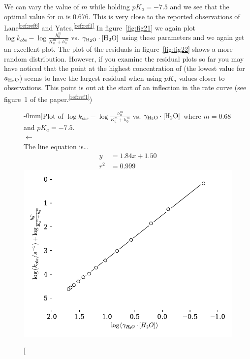 \documentclass[]{tufte-handout}
\begin{document}
We can vary the value of $m$ while holding $pK_a = -7.5$ and we see that the optimal value for $m$ is 0.676. This is very close to the reported observations of Lane\textsuperscript{\ref{ref:ref6}} and Yates.\textsuperscript{\ref{ref:ref1}} In figure~\vref{fig:fig21} we again plot $\log{k_{obs}}-\log{\frac{h_0^m}{K_a^m + h_0^m}}$ vs. $\gamma_{\ce{H2O}} \cdot [\ce{H2O}]$ using these parameters and we again get an excellent plot. The plot of the residuals in figure~\ref{fig:fig22} shows a more random distribution. However, if you examine the residual plots so far you may have noticed that the point at the highest concentration of  (the lowest value for $a_{\ce{H2O}}$) seems to have the largest residual when using $pK_a$ values closer to observations. This point is out at the start of an inflection in the rate curve (see figure~1 of the paper.\textsuperscript{\ref{ref:ref1}})

\begin{figure}[h!]
  \centering
  \caption[][-0mm]{Plot of $\log{k_{obs}}-\log{\frac{h_0^m}{K_a^m + h_0^m}}$ vs. $\gamma_{\ce{H2O}} \cdot [\ce{H2O}]$ where $m = 0.68$ and $pK_a = -7.5$. \\ $\longleftarrow$ \\ The line equation is\ldots \begin{align*}y &= 1.84x+1.50 \\ r^2 &= 0.999\end{align*}} 
  \includegraphics[scale=0.7]{images/fig21}
  \label{fig:fig21}
\end{figure}
\end{document}
